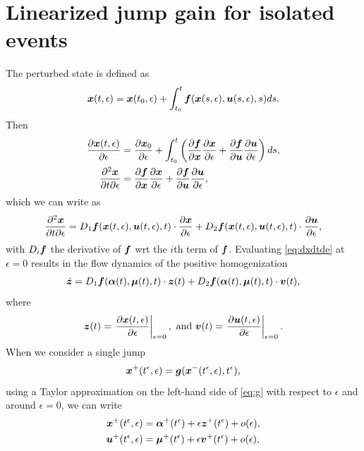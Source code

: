 \documentclass[../DC2019003Bouma.tex]{subfiles}
\begin{document}
\section{Linearized jump gain for isolated events}
The perturbed state is defined as
\begin{align}
{\boldsymbol{x}}(t,\epsilon) = {\boldsymbol{x}}(t_0,\epsilon) + \int_{t_0}^{t}{\boldsymbol{f}}({\boldsymbol{x}}(s,\epsilon),{\boldsymbol{u}}(s,\epsilon),s)ds.
\end{align}
Then
\begin{align}
\frac{\partial{\boldsymbol{x}}(t,\epsilon)}{\partial\epsilon} &= \frac{\partial{\boldsymbol{x}}_0}{\partial\epsilon} + \int_{t_0}^{t}\left(\frac{\partial{\boldsymbol{f}}}{\partial{\boldsymbol{x}}}\frac{\partial{\boldsymbol{x}}}{\partial\epsilon} + \frac{\partial{\boldsymbol{f}}}{\partial{\boldsymbol{u}}}\frac{\partial{\boldsymbol{u}}}{\partial\epsilon}\right)ds,\\
\frac{\partial^2{\boldsymbol{x}}}{\partial t\partial\epsilon} &= \frac{\partial{\boldsymbol{f}}}{\partial{\boldsymbol{x}}}\frac{\partial{\boldsymbol{x}}}{\partial\epsilon} + \frac{\partial{\boldsymbol{f}}}{\partial{\boldsymbol{u}}}\frac{\partial{\boldsymbol{u}}}{\partial\epsilon},
\end{align}
which we can write as
\begin{align}
\frac{\partial^2{\boldsymbol{x}}}{\partial t\partial\epsilon} = D_1{\boldsymbol{f}}({\boldsymbol{x}}(t,\epsilon),{\boldsymbol{u}}(t,\epsilon),t)\cdot \frac{\partial{\boldsymbol{x}}}{\partial\epsilon} + D_2{\boldsymbol{f}}({\boldsymbol{x}}(t,\epsilon),{\boldsymbol{u}}(t,\epsilon),t)\cdot \frac{\partial{\boldsymbol{u}}}{\partial\epsilon}, \label{eq:dxdtde}
\end{align}
with $D_i{\boldsymbol{f}}$ the derivative of ${\boldsymbol{f}}$ wrt the $i$th term of ${\boldsymbol{f}}$. Evaluating \eqref{eq:dxdtde} at $\epsilon = 0$ results in the flow dynamics of the positive homogenization
\begin{align}
\dot{{\boldsymbol{z}}} = D_1{\boldsymbol{f}}(\boldsymbol{\alpha}(t),\boldsymbol{\mu}(t),t)\cdot {\boldsymbol{z}}(t) + D_2{\boldsymbol{f}}(\boldsymbol{\alpha}(t),\boldsymbol{\mu}(t),t)\cdot {\boldsymbol{v}}(t),
\end{align}
where 
\begin{align}
{\boldsymbol{z}}(t) = \left.\frac{\partial{\boldsymbol{x}}(t,\epsilon)}{\partial\epsilon}\right|_{\epsilon=0},\text{ and } {\boldsymbol{v}}(t) = \left.\frac{\partial{\boldsymbol{u}}(t,\epsilon)}{\partial\epsilon}\right|_{\epsilon=0} .
\end{align}
When we consider a single jump
\begin{align}
{\boldsymbol{x}}^{+}(t^\epsilon,\epsilon) = {\boldsymbol{g}}({\boldsymbol{x}}^{-}(t^\epsilon,\epsilon),t^\epsilon),\label{eq:g}
\end{align}
using a Taylor approximation on the left-hand side of \eqref{eq:g} with respect to $\epsilon$ and around $\epsilon = 0$, we can write
\begin{align}
{\boldsymbol{x}}^{+}(t^\epsilon,\epsilon) &= \boldsymbol{\alpha}^{+}(t^\epsilon) + \epsilon {\boldsymbol{z}}^{+}(t^\epsilon) + o(\epsilon),\label{eq:xe}\\
{\boldsymbol{u}}^{+}(t^\epsilon,\epsilon) &= \boldsymbol{\mu}^{+}(t^\epsilon) + \epsilon {\boldsymbol{v}}^{+}(t^\epsilon) + o(\epsilon),\label{eq:ue}
\end{align}
\end{document}
